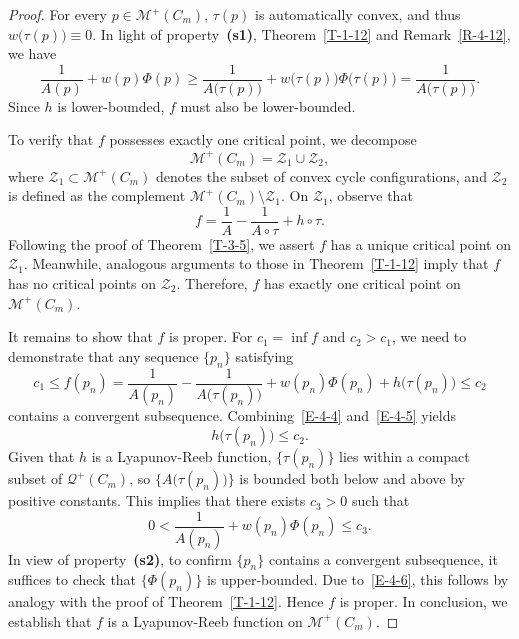 \documentclass[11pt,letterpaper]{amsart}
\theoremstyle{plain}
\theoremstyle{definition}
\theoremstyle{remark}
\numberwithin{equation}{section}
\begin{document}
\begin{proof}
For every $p\in \mathcal M^{+}(C_m)$, $\tau(p)$ is automatically convex, and thus $w\big(\tau(p)\big)\equiv0$. In light of property~\textbf{(s1)}, Theorem~\ref{T-1-12} and Remark~\ref{R-4-12}, we have
\begin{equation}\label{E-4-4}
\frac{1}{A(p)}+w(p)\Phi(p)\geq \frac{1}{A\big(\tau(p)\big)}
+w\big(\tau(p)\big)\Phi\big(\tau(p)\big)
=\frac{1}{A\big(\tau(p)\big)}.
\end{equation}
Since $h$ is lower-bounded, $f$ must also be lower-bounded.

To verify that $f$ possesses exactly one critical point, we decompose
\[
\mathcal M^{+}(C_m)=\mathcal Z_1\cup \mathcal Z_2,
\]
where $\mathcal Z_1\subset \mathcal M^{+}(C_m)$ denotes the subset of convex cycle configurations, and
$\mathcal Z_2$ is defined as the complement $\mathcal M^{+}(C_m)\setminus\mathcal Z_1$.
On $\mathcal Z_1$, observe that
\[
f=\frac{1}{A}-\frac{1}{A\circ\tau}+h\circ\tau.
\]
Following the proof of Theorem~\ref{T-3-5},  we assert $f$ has a unique critical point on $\mathcal Z_1$. Meanwhile, analogous arguments to those in Theorem~\ref{T-1-12} imply that $f$ has no critical points on $\mathcal Z_2$. Therefore, $f$ has exactly one critical point on $\mathcal M^{+}(C_m)$.

It remains to show that $f$ is proper. For $c_1=\inf f$ and $c_2>c_1$, we need to demonstrate that any sequence $\{p_n\}$ satisfying
\begin{equation}\label{E-4-5}
c_1\leq f(p_{n})=\frac{1}{A(p_{n})}
-\frac{1}{A\big(\tau(p_n)\big)}+w(p_{n})\Phi(p_{n})
+h\big(\tau(p_n)\big)
\leq c_2
\end{equation}
contains a convergent subsequence. Combining~\eqref{E-4-4} and~\eqref{E-4-5} yields
\[
h\big(\tau(p_n)\big)\leq c_2.
\]
Given that $h$ is a Lyapunov-Reeb function, $\big\{\tau(p_n)\big\}$ lies within a compact subset of $\mathcal Q^{+}(C_m)$, so $\big\{A\big(\tau(p_n)\big)\big\}$ is bounded both below and above by positive constants. This implies that there exists $c_3>0$ such that
\begin{equation}\label{E-4-6}
0<\frac{1}{A(p_{n})}+w(p_{n})\Phi(p_{n})\leq c_3.
\end{equation}
In view of property~\textbf{(s2)}, to confirm $\{p_n\}$ contains a convergent subsequence, it suffices to check that $\big\{\Phi(p_{n})\big\}$ is upper-bounded. Due to~\eqref{E-4-6}, this follows by analogy with the proof of Theorem~\ref{T-1-12}. Hence $f$ is proper. In conclusion, we establish that $f$ is a Lyapunov-Reeb function on $\mathcal M^{+}(C_m)$.
\end{proof}
\end{document}
